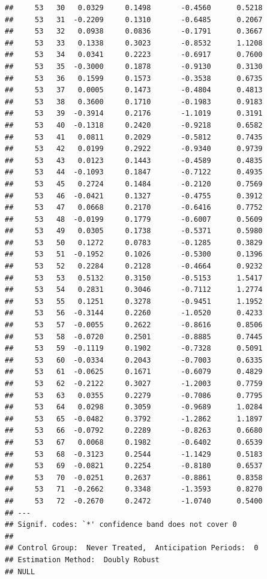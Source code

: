 \documentclass[
]{article}
\begin{document}
\begin{verbatim}
##     53   30   0.0329     0.1498       -0.4560      0.5218  
##     53   31  -0.2209     0.1310       -0.6485      0.2067  
##     53   32   0.0938     0.0836       -0.1791      0.3667  
##     53   33   0.1338     0.3023       -0.8532      1.1208  
##     53   34   0.0341     0.2223       -0.6917      0.7600  
##     53   35  -0.3000     0.1878       -0.9130      0.3130  
##     53   36   0.1599     0.1573       -0.3538      0.6735  
##     53   37   0.0005     0.1473       -0.4804      0.4813  
##     53   38   0.3600     0.1710       -0.1983      0.9183  
##     53   39  -0.3914     0.2176       -1.1019      0.3191  
##     53   40  -0.1318     0.2420       -0.9218      0.6582  
##     53   41   0.0811     0.2029       -0.5812      0.7435  
##     53   42   0.0199     0.2922       -0.9340      0.9739  
##     53   43   0.0123     0.1443       -0.4589      0.4835  
##     53   44  -0.1093     0.1847       -0.7122      0.4935  
##     53   45   0.2724     0.1484       -0.2120      0.7569  
##     53   46  -0.0421     0.1327       -0.4755      0.3912  
##     53   47   0.0668     0.2170       -0.6416      0.7752  
##     53   48  -0.0199     0.1779       -0.6007      0.5609  
##     53   49   0.0305     0.1738       -0.5371      0.5980  
##     53   50   0.1272     0.0783       -0.1285      0.3829  
##     53   51  -0.1952     0.1026       -0.5300      0.1396  
##     53   52   0.2284     0.2128       -0.4664      0.9232  
##     53   53   0.5132     0.3150       -0.5153      1.5417  
##     53   54   0.2831     0.3046       -0.7112      1.2774  
##     53   55   0.1251     0.3278       -0.9451      1.1952  
##     53   56  -0.3144     0.2260       -1.0520      0.4233  
##     53   57  -0.0055     0.2622       -0.8616      0.8506  
##     53   58  -0.0720     0.2501       -0.8885      0.7445  
##     53   59  -0.1119     0.1902       -0.7328      0.5091  
##     53   60  -0.0334     0.2043       -0.7003      0.6335  
##     53   61  -0.0625     0.1671       -0.6079      0.4829  
##     53   62  -0.2122     0.3027       -1.2003      0.7759  
##     53   63   0.0355     0.2279       -0.7086      0.7795  
##     53   64   0.0298     0.3059       -0.9689      1.0284  
##     53   65  -0.0482     0.3792       -1.2862      1.1897  
##     53   66  -0.0792     0.2289       -0.8263      0.6680  
##     53   67   0.0068     0.1982       -0.6402      0.6539  
##     53   68  -0.3123     0.2544       -1.1429      0.5183  
##     53   69  -0.0821     0.2254       -0.8180      0.6537  
##     53   70  -0.0251     0.2637       -0.8861      0.8358  
##     53   71  -0.2662     0.3348       -1.3593      0.8270  
##     53   72  -0.2670     0.2472       -1.0740      0.5400  
## ---
## Signif. codes: `*' confidence band does not cover 0
## 
## Control Group:  Never Treated,  Anticipation Periods:  0
## Estimation Method:  Doubly Robust
## NULL
\end{verbatim}
\end{document}

